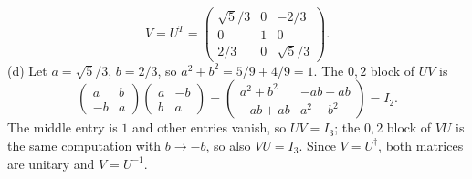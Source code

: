 \[
\boxed{V=U^T=\begin{pmatrix}\sqrt5/3&0&-2/3\\0&1&0\\2/3&0&\sqrt5/3\end{pmatrix}.}
\]
(d) Let $a=\sqrt5/3$, $b=2/3$, so $a^2+b^2=5/9+4/9=1$.
The $0,2$ block of $UV$ is
\[
\begin{pmatrix}a&b\\-b&a\end{pmatrix}
\begin{pmatrix}a&-b\\b&a\end{pmatrix}
=\begin{pmatrix}a^2+b^2&-ab+ab\\-ab+ab&a^2+b^2\end{pmatrix}=I_2.
\]
The middle entry is $1$ and other entries vanish, so $UV=I_3$; the
$0,2$ block of $VU$ is the same computation with $b\to-b$, so also
$VU=I_3$.
Since $V=U^\dagger$, both matrices are unitary and $V=U^{-1}$.

